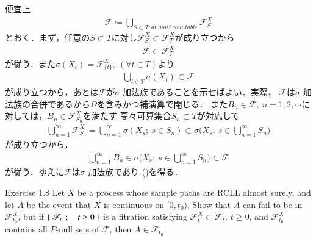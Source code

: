 \begin{prf}
	便宜上
	\begin{align}
		\mathcal{F} \coloneqq \bigcup_{S \subset T:at\ most\ countable} \mathcal{F}^X_S
	\end{align}
	とおく．まず，任意の$S \subset T$に対し$\mathcal{F}^X_S \subset \mathcal{F}^X_T$が成り立つから
	\begin{align}
		\mathcal{F} \subset \mathcal{F}^X_T
	\end{align}
	が従う．また$\sigma(X_t) = \mathcal{F}^X_{\{t\}},\ (\forall t \in T)$より
	\begin{align}
		\bigcup_{t \in T} \sigma(X_t) \subset \mathcal{F}
	\end{align}
	が成り立つから，あとは$\mathcal{F}$が$\sigma$-加法族であることを示せばよい．実際，
	$\mathcal{F}$は$\sigma$-加法族の合併であるから$\Omega$を含みかつ補演算で閉じる．
	また$B_n \in \mathcal{F},\ n=1,2,\cdots$に対しては，$B_n \in \mathcal{F}^X_{S_n}$を満たす
	高々可算集合$S_n \subset T$が対応して
	\begin{align}
		\bigcup_{n=1}^\infty \mathcal{F}^X_{S_n}
		= \bigcup_{n=1}^\infty \sigma(X_s;\ s \in S_n)
		\subset \sigma\biggl(X_s;\ s \in \bigcup_{n=1}^\infty S_n \biggr)
	\end{align}
	が成り立つから，
	\begin{align}
		\bigcup_{n=1}^\infty B_n \in \sigma\biggl(X_s;\ s \in \bigcup_{n=1}^\infty S_n \biggr)
		\subset \mathcal{F}
	\end{align}
	が従う．ゆえに$\mathcal{F}$は$\sigma$-加法族であり
	()を得る．
	\QED
\end{prf}

\begin{itembox}[l]{Exercise 1.8}
	Let $X$ be a process whose sample paths are RCLL almost surely, 
	and let $A$ be the event that $X$ is continuous on $[0,t_0)$. Show 
	that $A$ can fail to be in $\mathscr{F}^X_{t_0}$, but if $\left\{\ \mathscr{F}_t\ \, ; \quad t \geq 0\ \right\}$ is 
	a fitration satisfying $\mathscr{F}^X_t \subset \mathscr{F}_t,\ t \geq 0$, and 
	$\mathscr{F}^X_{t_0}$ contains all $P$-null sets of $\mathscr{F}$, then $A \in \mathscr{F}_{t_0}$.
\end{itembox}

